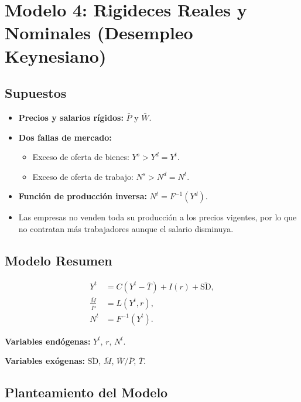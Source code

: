 \documentclass[
  doc,
  floatsintext,
  longtable,
  a4paper,
  nolmodern,
  notxfonts,
  notimes,
  colorlinks=true,linkcolor=blue,citecolor=blue,urlcolor=blue]{apa7}
\providecommand{\tightlist}{%
  \setlength{\itemsep}{0pt}\setlength{\parskip}{0pt}}
\begin{document}
\section{Modelo 4: Rigideces Reales y Nominales (Desempleo
Keynesiano)}\label{modelo-4-rigideces-reales-y-nominales-desempleo-keynesiano}

\subsection{Supuestos}\label{supuestos-3}

\begin{itemize}
\tightlist
\item
  \textbf{Precios y salarios rígidos:} \(\bar{P}\) y \(\bar{W}\).
\item
  \textbf{Dos fallas de mercado:}

  \begin{itemize}
  \tightlist
  \item
    Exceso de oferta de bienes: \(Y^s > Y^d = Y^t\).
  \item
    Exceso de oferta de trabajo: \(N^s > N^d = N^t\).
  \end{itemize}
\item
  \textbf{Función de producción inversa:} \(N^t = F^{-1}(Y^d)\).
\item
  Las empresas no venden toda su producción a los precios vigentes, por
  lo que no contratan más trabajadores aunque el salario disminuya.
\end{itemize}

\subsection{Modelo Resumen}\label{modelo-resumen}

\[
\begin{aligned}
Y^t &= C(Y^t - \bar{T}) + I(r) + \bar{\mathrm{SD}}, \\
\frac{\bar{M}}{\bar{P}} &= L(Y^t, r), \\
N^t &= F^{-1}(Y^t).
\end{aligned}
\]

\textbf{Variables endógenas:} \(Y^t\), \(r\), \(N^t\).

\textbf{Variables exógenas:} \(\bar{\mathrm{SD}}\), \(\bar{M}\),
\(\bar{W}/\bar{P}\), \(\bar{T}\).

\subsection{Planteamiento del Modelo}\label{planteamiento-del-modelo-1}
\end{document}
